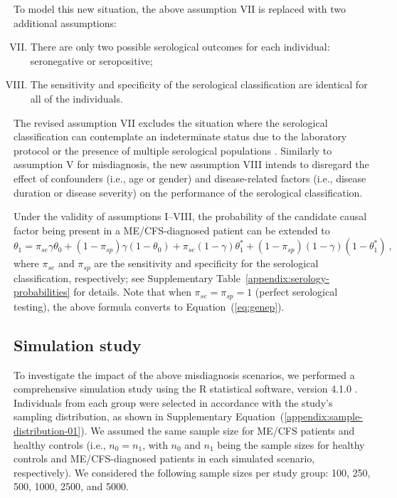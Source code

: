 To model this new situation, the above assumption VII is replaced with two additional assumptions:
% 
\begin{enumerate}[I.\ ]
    \setcounter{enumi}{6}
    \setlength{\itemsep}{1.5pt}
    \setlength{\parskip}{0pt}
    \setlength{\parsep}{0pt}
    \item There are only two possible serological outcomes for each individual: seronegative or seropositive;
    \item The sensitivity and specificity of the serological classification are identical for all of the individuals.
\end{enumerate}

The revised assumption VII excludes the situation where the serological classification can contemplate an indeterminate status due to the laboratory protocol \citep{cliff2019CellularImmune} or the presence of multiple serological populations \citep{sepulveda2015CurrentMathematical}. Similarly to assumption V for misdiagnosis, the new assumption VIII intends to disregard the effect of confounders (i.e., age or gender) and disease-related factors (i.e., disease duration or disease severity) on the performance of the serological classification.

Under the validity of assumptions I--VIII, the probability of the candidate causal factor being present in a ME/CFS-diagnosed patient can be extended to
% 
\begin{equation}
    \theta_1 = \pi_{se} \gamma \theta_0 + (1-\pi_{sp}) \gamma (1-\theta_0) + \pi_{se}(1-\gamma)\theta_1^* + (1-\pi_{sp})(1-\gamma)(1-\theta_1^*) \ ,
    \label{eq:serop}
\end{equation}
% 
where $\pi_{se}$ and $\pi_{sp}$ are the sensitivity and specificity for the serological classification, respectively; see Supplementary Table~\ref{appendix:serology-probabilities} for details. Note that when $\pi_{se} = \pi_{sp} = 1$ (perfect serological testing), the above formula converts to Equation~(\ref{eq:genep}).

\subsection{Simulation study}

To investigate the impact of the above misdiagnosis scenarios, we performed a comprehensive simulation study using the R statistical software, version 4.1.0 \citep{rcoreteamLanguageEnvironmentStatistical2020}. Individuals from each group were selected in accordance with the study's sampling distribution, as shown in Supplementary Equation~(\ref{appendix:sample-distribution-01}). We assumed the same sample size for ME/CFS patients and healthy controls (i.e., $n_0 = n_1$, with $n_0$ and $n_1$ being the sample sizes for healthy controls and ME/CFS-diagnosed patients in each simulated scenario, respectively). We considered the following sample sizes per study group: 100, 250, 500, 1000, 2500, and 5000.

